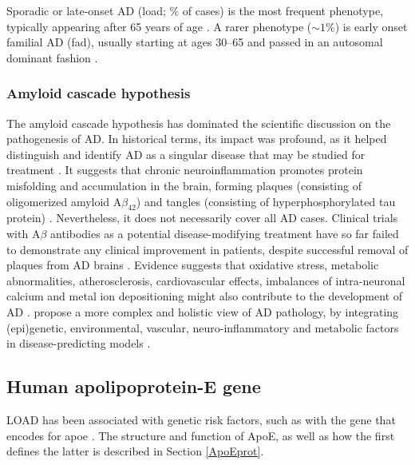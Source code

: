 \documentclass{amsart}
\begin{document}
Sporadic or late-onset AD (\acrshort{load}; \% of cases) is the most frequent phenotype, typically appearing after 65 years of age \cite{Beydoun2014EpidemiologicMeta-analysis}. A rarer phenotype ($\sim1\%$) is early onset familial AD (\acrshort{fad}), usually starting at ages 30–65 and passed in an autosomal dominant fashion \cite{VanCauwenberghe2015ThePerspectives}.

\subsubsection{Amyloid cascade hypothesis}
The amyloid cascade hypothesis has dominated the scientific discussion on the pathogenesis of AD. In historical terms, its impact was profound, as it helped distinguish and identify AD as a singular disease that may be studied for treatment \cite{Hardy2006AlzheimersReappraisal}. It suggests that chronic neuroinflammation promotes protein misfolding and accumulation in the brain, forming plaques (consisting of oligomerized amyloid A$\beta_{42}$) and tangles (consisting of hyperphosphorylated tau protein) \cite{Edwards2019ANeurodegeneration}. Nevertheless, it does not necessarily cover all AD cases. Clinical trials with A$\beta$ antibodies as a potential disease-modifying treatment have so far failed to demonstrate any clinical improvement in patients, despite successful removal of plaques from AD brains \cite{Kepp2023TheReview,Kurkinen2023TheThinking}. Evidence suggests that oxidative stress, metabolic abnormalities, atherosclerosis, cardiovascular effects, imbalances of intra-neuronal calcium and metal ion depositioning might also contribute to the development of AD \cite{Kepp2023TheReview}. \citeauthor{Kepp2023TheReview} propose a more complex and holistic view of AD pathology, by integrating (epi)genetic, environmental, vascular, neuro-inflammatory and metabolic factors in disease-predicting models \cite{Kepp2023TheReview}.

\subsection{Human apolipoprotein-E gene}
LOAD has been associated with genetic risk factors, such as with the gene that encodes for \acrfull{apoe} \cite{Corder1993GeneFamilies}. The structure and function of ApoE, as well as how the first defines the latter is described in Section \ref{ApoEprot}.
\end{document}
